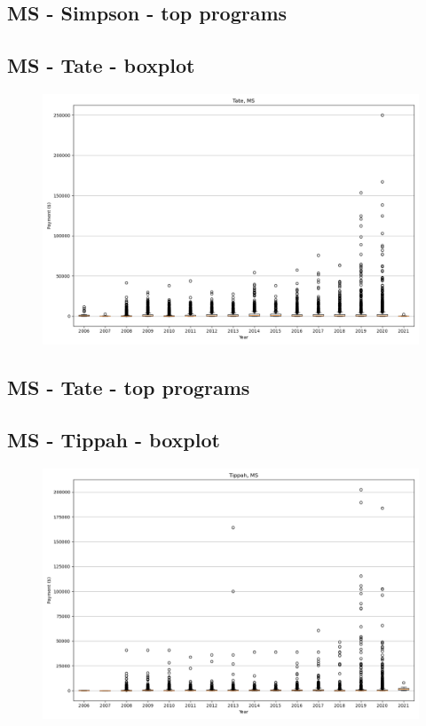 \subsection*{MS - Simpson - top programs}

\newpage
\subsection*{MS - Tate - boxplot}
\begin{figure}[h]
\centering
\includegraphics[width=7in]{../output/boxplots/counties/Tate-MS_boxplot.png}
\end{figure}


\subsection*{MS - Tate - top programs}

\newpage
\subsection*{MS - Tippah - boxplot}
\begin{figure}[h]
\centering
\includegraphics[width=7in]{../output/boxplots/counties/Tippah-MS_boxplot.png}
\end{figure}


